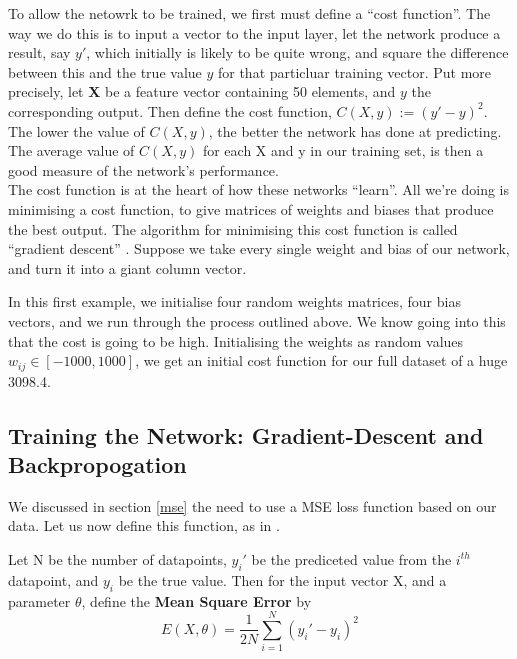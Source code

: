 To allow the netowrk to be trained, we first must define a ``cost function''. The way we do this is to input a vector to the input layer, let the network produce a result, say $y'$, which
initially is likely to be quite wrong, and square the difference between this and the true value $y$ for that particluar training vector. Put more precisely,
let \textbf{X} be a feature vector containing 50 elements, and $y$ the corresponding output. Then define the cost function, $C(X,y) := (y'-y)^2$. The lower the value of $C(X,y)$, the 
better the network has done at predicting. The average value of $C(X,y)$ for each X and y in our training set, is then a good measure of the network's performance. \\

The cost function is at the heart of how these networks ``learn''. All we're doing is minimising a cost function, to give matrices of weights and biases that
produce the best output. The algorithm for minimising this cost function is called ``gradient descent'' \cite{cauchy}. Suppose we take every single weight and bias of our network,
and turn it into a giant column vector. 

\begin{example}
    In this first example, we initialise four random weights matrices, four bias vectors, and we run through the process outlined above. We know going into this that 
    the cost is going to be high. Initialising the weights as random values $w_{ij} \in [-1000,1000]$, we get an initial cost function for our full dataset of a huge
    3098.4. 
\end{example}

\subsection{Training the Network: Gradient-Descent and Backpropogation}

We discussed in section \ref{mse} the need to use a MSE loss function based on our data. Let us now define this function, as in \cite{huber}.

\begin{definition}
    Let N be the number of datapoints, $y_i'$ be the prediceted value from the $i^{th}$ datapoint, and $y_i$ be the true value. Then for the input vector X, and a parameter $\theta$,
    define the \textbf{Mean Square Error} by
    \begin{equation}
        E(X,\theta) = \frac{1}{2N}\sum^N_{i=1}(y_i'-y_i)^2
    \end{equation}
\end{definition}

